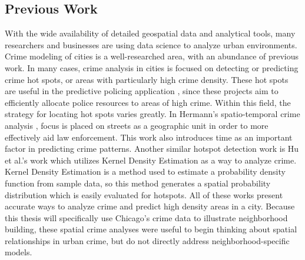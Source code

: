 \documentclass[times new roman,12pt]{article}
\begin{document}
\subsection{Previous Work}

With the wide availability of detailed geospatial data and analytical tools, many researchers and businesses are using data science to analyze urban environments. Crime modeling of cities is a well-researched area, with an abundance of previous work. In many cases, crime analysis in cities is focused on detecting or predicting crime hot spots, or areas with particularly high crime density. These hot spots are useful in the predictive policing application \cite{perry_predictive_2013}, since these projects aim to efficiently allocate police resources to areas of high crime. Within this field, the strategy for locating hot spots varies greatly. In Hermann's spatio-temporal crime analysis \cite{herrmann_street-level_2013}, focus is placed on streets as a geographic unit in order to more effectively aid law enforcement. This work also introduces time as an important factor in predicting crime patterns. Another similar hotspot detection work is Hu et al.'s work \cite{hu_spatio-temporal_2018} which utilizes Kernel Density Estimation as a way to analyze crime. Kernel Density Estimation is a method used to estimate a probability density function from sample data, so this method generates a spatial probability distribution which is easily evaluated for hotspots. All of these works present accurate ways to analyze crime and predict high density areas in a city. Because this thesis will specifically use Chicago's crime data to illustrate neighborhood building, these spatial crime analyses were useful to begin thinking about spatial relationships in urban crime, but do not directly address neighborhood-specific models. 
\end{document}
